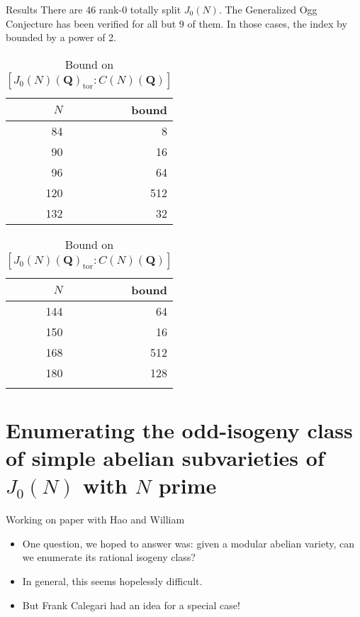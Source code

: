 \documentclass{beamer}
\newcommand{\QQ}{\mathbf{Q}}
\newcommand{\tor}{\mathrm{tor}}
\begin{document}
\begin{frame}{Results}
    There are 46 rank-0 totally split $J_0(N)$. The Generalized Ogg Conjecture
    has been verified for all but 9 of them. In those cases, the index by
    bounded by a power of 2.
\begin{table}%
    \label{tab:rank_zero_bound}
    \caption{Bound on $[J_0(N)(\QQ)_\tor:C(N)(\QQ)]$}
    \centering
    \begin{tabular}{rr}
        \toprule
        $N$ & bound \\
        \midrule
        84 & 8 \\
        90 & 16 \\
        96 & 64 \\
        120 & 512 \\
        132 & 32 \\
        \bottomrule
    \end{tabular}
    \begin{tabular}{rr}
        \toprule
        $N$ & bound \\
        \midrule
        144 & 64 \\
        150 & 16 \\
        168 & 512 \\
        180 & 128  \\
            &  \\
        \bottomrule
    \end{tabular}
\end{table}
\end{frame}

\section{Enumerating the odd-isogeny class of simple abelian subvarieties of
$J_0(N)$ with $N$ prime}

\begin{frame}{Working on paper with Hao and William}
    \begin{itemize}
        \item
            One question, we hoped to answer was: given a modular abelian
            variety, can we enumerate its rational isogeny class?
        \item
            In general, this seems hopelessly difficult.
        \item
            But Frank Calegari had an idea for a special case!
    \end{itemize}
\end{frame}
\end{document}
